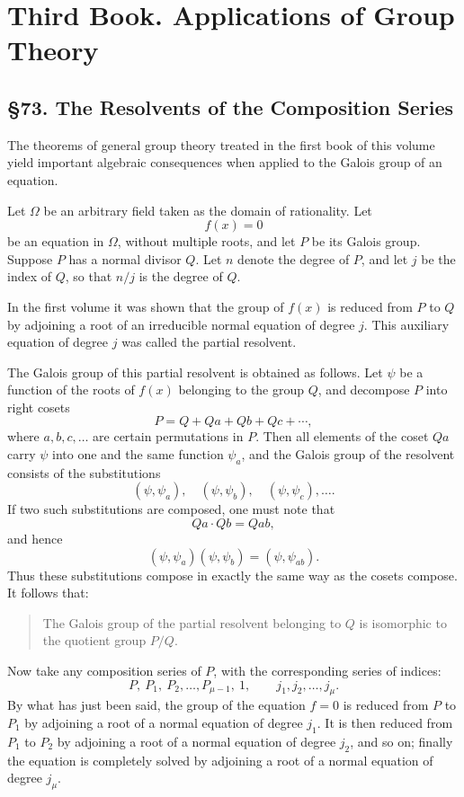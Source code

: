 \documentclass[11pt,a4paper]{book}
\newcommand{\webersection}[2]{\clearpage\section*{\S #1. #2}}
\newcommand{\booktitle}[1]{\clearpage\chapter*{#1}}
\begin{document}
\booktitle{Third Book. Applications of Group Theory}

\webersection{73}{The Resolvents of the Composition Series}

The theorems of general group theory treated in the first book of this volume yield important algebraic consequences when applied to the Galois group of an equation.

Let \(\Omega\) be an arbitrary field taken as the domain of rationality.  Let
\[
 f(x)=0
\]
be an equation in \(\Omega\), without multiple roots, and let \(P\) be its Galois group.  Suppose \(P\) has a normal divisor \(Q\).  Let \(n\) denote the degree of \(P\), and let \(j\) be the index of \(Q\), so that \(n/j\) is the degree of \(Q\).

In the first volume it was shown that the group of \(f(x)\) is reduced from \(P\) to \(Q\) by adjoining a root of an irreducible normal equation of degree \(j\).  This auxiliary equation of degree \(j\) was called the partial resolvent.

The Galois group of this partial resolvent is obtained as follows.  Let \(\psi\) be a function of the roots of \(f(x)\) belonging to the group \(Q\), and decompose \(P\) into right cosets
\[
 P=Q+Qa+Qb+Qc+\cdots ,
\]
where \(a,b,c,\ldots\) are certain permutations in \(P\).  Then all elements of the coset \(Qa\) carry \(\psi\) into one and the same function \(\psi_a\), and the Galois group of the resolvent consists of the substitutions
\[
 (\psi,\psi_a),\quad(\psi,\psi_b),\quad(\psi,\psi_c),\ldots .
\]
If two such substitutions are composed, one must note that
\[
 Qa\cdot Qb=Qab,
\]
and hence
\[
 (\psi,\psi_a)(\psi,\psi_b)=(\psi,\psi_{ab}).
\]
Thus these substitutions compose in exactly the same way as the cosets compose.  It follows that:

\begin{quote}
The Galois group of the partial resolvent belonging to \(Q\) is isomorphic to the quotient group \(P/Q\).
\end{quote}

Now take any composition series of \(P\), with the corresponding series of indices:
\[
 P,\ P_1,\ P_2,\ldots,P_{\mu-1},\ 1,
 \qquad
 j_1,j_2,\ldots,j_\mu .
\]
By what has just been said, the group of the equation \(f=0\) is reduced from \(P\) to \(P_1\) by adjoining a root of a normal equation of degree \(j_1\).  It is then reduced from \(P_1\) to \(P_2\) by adjoining a root of a normal equation of degree \(j_2\), and so on; finally the equation is completely solved by adjoining a root of a normal equation of degree \(j_\mu\).
\end{document}
